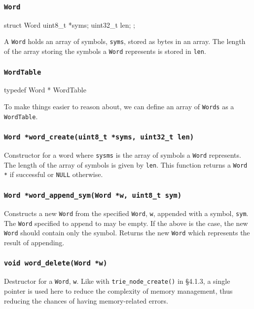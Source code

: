 \documentclass{article}
\begin{document}
\subsubsection{\texttt{Word}}
\begin{clisting}{}
struct Word {
    uint8_t *syms;
    uint32_t len;
};
\end{clisting}
A \texttt{Word} holds an array of symbols, \texttt{syms}, stored as bytes
in an array. The length of the array storing the symbols a \texttt{Word}
represents is stored in \texttt{len}.

\subsubsection{\texttt{WordTable}}
\begin{clisting}{}
typedef Word * WordTable
\end{clisting}

To make things easier to reason about, we can define an array of \texttt{Words}
as a \texttt{WordTable}.

\subsubsection{\texttt{Word *word\_create(uint8\_t *syms, uint32\_t len)}}
Constructor for a word where \texttt{sysms} is the array of symbols
a \texttt{Word} represents. The length of the array of symbols
is given by \texttt{len}. This function returns a \texttt{Word *}
if successful or \texttt{NULL} otherwise.

\subsubsection{\texttt{Word *word\_append\_sym(Word *w, uint8\_t sym)}}
Constructs a new \texttt{Word} from the specified \texttt{Word}, \texttt{w},
appended with a symbol, \texttt{sym}.
The \texttt{Word} specified to append to may be empty.
If the above is the case, the new \texttt{Word} should contain only the symbol.
Returns the new \texttt{Word} which represents the result of appending.

\subsubsection{\texttt{void word\_delete(Word *w)}}
Destructor for a \texttt{Word}, \texttt{w}. Like with
\texttt{trie\_node\_create()} in \S 4.1.3, a single pointer is used
here to reduce the complexity of memory management, thus reducing the
chances of having memory-related errors.
\end{document}
